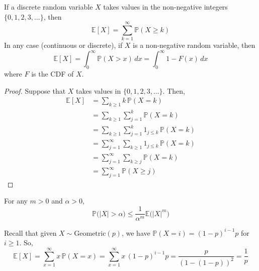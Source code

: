   \begin{theorem}
    If a discrete random variable $X$ takes values in the non-negative integers $\{0, 1, 2, 3, ...\}$, then 
    \begin{equation}
      \mathbb{E}[X] = \sum_{k=1}^\infty \mathbb{P}(X \geq k)
    \end{equation}
    In any case (continuous or discrete), if $X$ is a non-negative random variable, then 
    \begin{equation}
      \mathbb{E}[X] = \int_0^\infty \mathbb{P}(X > x) \, dx = \int_0^\infty 1 - F(x) \, dx
    \end{equation}
    where $F$ is the CDF of $X$. 
  \end{theorem}
  \begin{proof}
    Suppose that $X$ takes values in $\{0, 1, 2, 3, ...\}$. Then, 
    \begin{align*}
      \mathbb{E}[X] & = \sum_{k \geq 1} k \, \mathbb{P}(X=k) \\
      & = \sum_{k\geq 1} \sum_{j=1}^k \mathbb{P}(X = k) \\
      & = \sum_{k \geq 1} \sum_{j=1}^k 1_{j \leq k} \, \mathbb{P}(X=k) \\
      & = \sum_{j=1}^\infty \sum_{k \geq 1} 1_{j \leq k} \, \mathbb{P}(X =k) \\
      & = \sum_{j=1}^\infty \sum_{k \geq j} \mathbb{P}(X=k) \\
      & = \sum_{j=1}^\infty \mathbb{P}(X \geq j)
    \end{align*}
  \end{proof}

  \begin{corollary}
    For any $m > 0$ and $\alpha > 0$,  
    \begin{equation}
      \mathbb{P} \big(|X| > \alpha \big) \leq \frac{1}{\alpha^m} \mathbb{E} \big( |X|^m \big)
    \end{equation}
  \end{corollary}

  \begin{example}[Geometric RV]
    Recall that given $X \sim \mathrm{Geometric}(p)$, we have $\mathbb{P}(X = i) = (1 - p)^{i-1} p$ for $i \geq 1$. So, 
    \begin{equation}
      \mathbb{E}[X] = \sum_{x=1}^\infty x \, \mathbb{P}(X = x) = \sum_{x=1}^\infty x \, (1 - p)^{i-1} p = \frac{p}{(1 - (1 - p))^2} = \frac{1}{p}
    \end{equation}
  \end{example}


